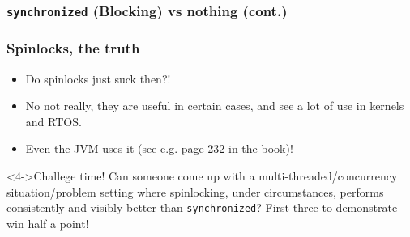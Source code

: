\documentclass[xcolor={dvipsnames,svgnames},aspectratio=169]{beamer}
\begin{document}

\begin{frame}[fragile]
  \frametitle{\texttt{synchronized} (Blocking) vs nothing (cont.)}

  \begin{center}
  \end{center}
\end{frame}

\begin{frame}[fragile]
  \frametitle{Spinlocks, the truth}
    \begin{itemize}
  \item[\faBook]<1-> Do spinlocks just suck then?!
  \item[\faBook]<2-> No not really, they are useful in certain cases, and see a lot of use
    in kernels and RTOS.
  \item[\faBook]<3-> Even the JVM uses it (see e.g. page 232 in the book)!
  \end{itemize}
  \vspace{0.6cm}
  \begin{block}<4->{\faPuzzlePiece \quad Challege time!}
    Can someone come up with a multi-threaded/concurrency situation/problem setting
    where spinlocking, under circumstances, performs consistently and visibly
    better than \texttt{synchronized}? First three to demonstrate win half a point!
  \end{block}
\end{frame}
\end{document}
